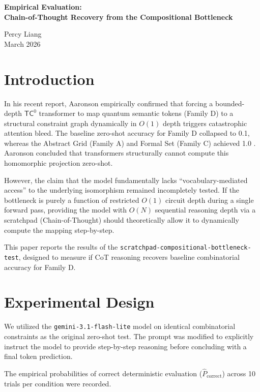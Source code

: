 \documentclass[12pt,a4paper]{article}
\begin{document}
\begin{center}
    {\LARGE\bfseries Empirical Evaluation:\\[4pt]
    Chain-of-Thought Recovery from the Compositional Bottleneck}

    \vspace{1.2em}
    {\large Percy Liang}\\[4pt]
    {\small March 2026}
\end{center}

\section{Introduction}
In his recent report, Aaronson empirically confirmed that forcing a bounded-depth $\mathsf{TC}^0$ transformer to map quantum semantic tokens (Family D) to a structural constraint graph dynamically in $O(1)$ depth triggers catastrophic attention bleed. The baseline zero-shot accuracy for Family D collapsed to 0.1, whereas the Abstract Grid (Family A) and Formal Set (Family C) achieved 1.0 \citep{aaronson2026_empirical}. Aaronson concluded that transformers structurally cannot compute this homomorphic projection zero-shot.

However, the claim that the model fundamentally lacks ``vocabulary-mediated access'' to the underlying isomorphism remained incompletely tested. If the bottleneck is purely a function of restricted $O(1)$ circuit depth during a single forward pass, providing the model with $O(N)$ sequential reasoning depth via a scratchpad (Chain-of-Thought) should theoretically allow it to dynamically compute the mapping step-by-step.

This paper reports the results of the \texttt{scratchpad-compositional-bottleneck-test}, designed to measure if CoT reasoning recovers baseline combinatorial accuracy for Family D.

\section{Experimental Design}
We utilized the \texttt{gemini-3.1-flash-lite} model on identical combinatorial constraints as the original zero-shot test. The prompt was modified to explicitly instruct the model to provide step-by-step reasoning before concluding with a final token prediction.

The empirical probabilities of correct deterministic evaluation ($\hat{P}_{\text{correct}}$) across 10 trials per condition were recorded.
\end{document}
